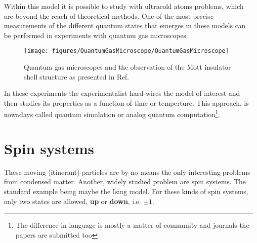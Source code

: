 \documentclass[10pt]{article}
\let\cite\citep
\providecommand\citep{\cite}
\begin{document}
Within this model it is possible to study with ultracold atoms problems, which are beyond the reach of theoretical methods. One of the most precise measurements of the different quantum states that emerges in these models can be performed in experiments with quantum gas microscopes.
\begin{figure}[h!]
\begin{center}
\texttt{[image: figures/QuantumGasMicroscope/QuantumGasMicroscope]}
\caption{{Quantum gas microscopes and the observation of the Mott insulator shell
structure as presented in Ref. \protect\cite{Sherson_2010}
{\label{783515}}%
}}
\end{center}
\end{figure}

In these experiments the experimentalist hard-wires the model of interest and then studies its properties as a function of time or temperture. This approach, is nowadays called quantum simulation or analog quantum computation\footnote{The difference in language is mostly a matter of community and journals the papers are submitted too}.

\section{Spin systems}
These moving (itinerant) particles are by no means the only interesting problems from condensed matter. Another, widely studied problem are spin systems. The standard example being maybe the Ising model. For these kinds of spin systems, only two states are allowed, \textbf{up} or \textbf{down}, i.e. $\pm 1$. 
\end{document}

